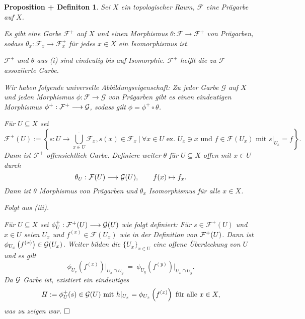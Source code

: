 \documentclass[11pt]{book}
\newtheorem{propdefini}[theorem]{Proposition + Definiton}
\theoremstyle{nonumberbreak}
\newenvironment{pr}[1][]{\ifthenelse{\equal{#1}{}}{\proof}{\proof[#1]}\rm}{\endproof}
\begin{document}
\begin{spacing}{1.4}
\begin{propdefini} %

Sei $X$ ein topologischer Raum, $\mathcal{F}$ eine Prägarbe auf $X$.

\begin{compactenum}
\item Es gibt eine Garbe $\mathcal{F}^{+}$ auf $X$ und einen Morphismus $\theta: \mathcal{F} \longrightarrow \mathcal{F}^{+}$ von Prägarben, sodass $\theta_x: \mathcal{F}_x \longrightarrow \mathcal{F}_x^{+}$ für jedes $x \in X$ ein Isomorphismus ist.
\item $\mathcal{F}^+$ und $\theta$ aus (i) sind eindeutig bis auf Isomorphie. $\mathcal{F}^+$ heißt \textit{die zu} $\mathcal{F}$ \textit{assoziierte Garbe}.
\item Wir haben folgende universelle Abbildungseigenschaft: Zu jeder Garbe $\mathcal{G}$ auf $X$ und jeden Morphismus $\phi: \mathcal{F} \longrightarrow \mathcal{G}$ von Prägarben gibt es einen eindeutigen Morphismus $\phi^+: \mathcal{F}^+ \longrightarrow \mathcal{G}$, sodass gilt $\phi = \phi^+ \circ \theta$.

\end{compactenum}

\begin{pr} 
\begin{compactenum}
\item Für $U \subseteq X$ sei
$$\mathcal{F}^+(U) := \left\{ s:U \longrightarrow \bigcup_{x \in U}^{.} \mathcal{F}_x, s(x) \in\mathcal{F}_x \ \big\vert \ \forall x \in U \textrm{ ex. } U_x \ni x \textrm{ und } f \in \mathcal{F}(U_x) \textrm{ mit } s \vert _{U_x} = f \right\}.$$
Dann ist $\mathcal{F}^{+}$ offensichtlich Garbe. Definiere weiter $\theta$ für $U \subseteq X$ offen mit $x \in U$ durch
$$\theta_{U}: \mathcal{F}(U) \longrightarrow \mathcal{G}(U), \qquad f(x) \mapsto f_x.$$
Dann ist $\theta$ Morphismus von Prägarben und $\theta_x$ Isomorphismus für alle $x \in X$.
\item Folgt aus (iii).
\item Für $U \subseteq X$ sei $\phi_U^+: \mathcal{F}^+(U) \longrightarrow \mathcal{G}(U)$ wie folgt definiert: Für $s \in \mathcal{F}^+(U)$ und $x \in U$ seien $U_x$ und $f^{(x)} \in \mathcal{F}(U_x)$ wie in der Definition von $\mathcal{F}^+(U)$. Dann ist $\phi_{U_x}\left( f^{(x)} \right) \in \mathcal{G}(U_x)$. Weiter bilden die $\{U_x\}_{x \in U}$ eine offene Überdeckung von $U$ und es gilt
$$\phi_{U_x} \left( f^{(x)} \right) \vert _{U_x \cap U_y} \ = \ \phi_{U_y}\left(f^{(y)}\right) \vert_{U_x \cap U_y}.$$
Da $\mathcal{G}$ Garbe ist, existiert ein eindeutiges 
$$H:= \phi_U^+(s) \in \mathcal{G}(U) \textrm{ mit }h \vert_{U_x} = \phi_{U_x} \left(f^{(x)}\right) \textrm{ für alle } x \in X,$$ was zu zeigen war. $\hfill \Box$
\end{compactenum}
\end{pr}


\end{propdefini}
\end{spacing}
\end{document}
